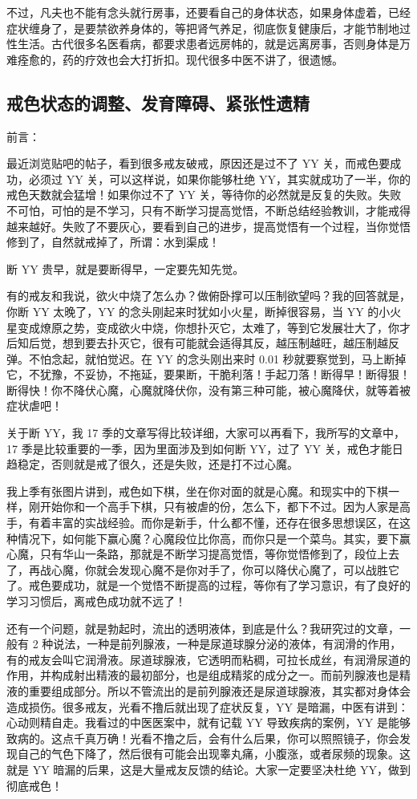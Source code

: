 \documentclass[fontset=founder]{ctexart}
\begin{document}
不过，凡夫也不能有念头就行房事，还要看自己的身体状态，如果身体虚着，已经症状缠身了，是要禁欲养身体的，等把肾气养足，彻底恢复健康后，才能节制地过性生活。古代很多名医看病，都要求患者远房帏的，就是远离房事，否则身体是万难痊愈的，药的疗效也会大打折扣。现代很多中医不讲了，很遗憾。

\subsection{戒色状态的调整、发育障碍、紧张性遗精}

前言：

最近浏览贴吧的帖子，看到很多戒友破戒，原因还是过不了 YY 关，而戒色要成功，必须过 YY 关，可以这样说，如果你能够杜绝 YY，其实就成功了一半，你的戒色天数就会猛增！如果你过不了 YY 关，等待你的必然就是反复的失败。失败不可怕，可怕的是不学习，只有不断学习提高觉悟，不断总结经验教训，才能戒得越来越好。失败了不要灰心，要看到自己的进步，提高觉悟有一个过程，当你觉悟修到了，自然就戒掉了，所谓：水到渠成！

断 YY 贵早，就是要断得早，一定要先知先觉。

有的戒友和我说，欲火中烧了怎么办？做俯卧撑可以压制欲望吗？我的回答就是，你断 YY 太晚了，YY 的念头刚起来时犹如小火星，断掉很容易，当 YY 的小火星变成燎原之势，变成欲火中烧，你想扑灭它，太难了，等到它发展壮大了，你才后知后觉，想到要去扑灭它，很有可能就会适得其反，越压制越旺，越压制越反弹。不怕念起，就怕觉迟。在 YY 的念头刚出来时 0.01 秒就要察觉到，马上断掉它，不犹豫，不妥协，不拖延，要果断，干脆利落！手起刀落！断得早！断得狠！断得快！你不降伏心魔，心魔就降伏你，没有第三种可能，被心魔降伏，就等着被症状虐吧！

关于断 YY，我 17 季的文章写得比较详细，大家可以再看下，我所写的文章中，17 季是比较重要的一季，因为里面涉及到如何断 YY，过了 YY 关，戒色才能日趋稳定，否则就是戒了很久，还是失败，还是打不过心魔。

我上季有张图片讲到，戒色如下棋，坐在你对面的就是心魔。和现实中的下棋一样，刚开始你和一个高手下棋，只有被虐的份，怎么下，都下不过。因为人家是高手，有着丰富的实战经验。而你是新手，什么都不懂，还存在很多思想误区，在这种情况下，如何能下赢心魔？心魔段位比你高，而你只是一个菜鸟。其实，要下赢心魔，只有华山一条路，那就是不断学习提高觉悟，等你觉悟修到了，段位上去了，再战心魔，你就会发现心魔不是你对手了，你可以降伏心魔了，可以战胜它了。戒色要成功，就是一个觉悟不断提高的过程，等你有了学习意识，有了良好的学习习惯后，离戒色成功就不远了！

还有一个问题，就是勃起时，流出的透明液体，到底是什么？我研究过的文章，一般有 2 种说法，一种是前列腺液，一种是尿道球腺分泌的液体，有润滑的作用，有的戒友会叫它润滑液。尿道球腺液，它透明而粘稠，可拉长成丝，有润滑尿道的作用，并构成射出精液的最初部分，也是组成精浆的成分之一。而前列腺液也是精液的重要组成部分。所以不管流出的是前列腺液还是尿道球腺液，其实都对身体会造成损伤。很多戒友，光看不撸后就出现了症状反复，YY 是暗漏，中医有讲到：心动则精自走。我看过的中医医案中，就有记载 YY 导致疾病的案例，YY 是能够致病的。这点千真万确！光看不撸之后，会有什么后果，你可以照照镜子，你会发现自己的气色下降了，然后很有可能会出现睾丸痛，小腹涨，或者尿频的现象。这就是 YY 暗漏的后果，这是大量戒友反馈的结论。大家一定要坚决杜绝 YY，做到彻底戒色！
\end{document}
